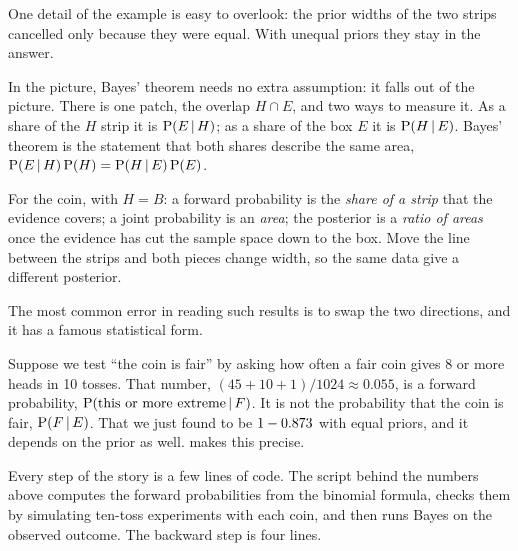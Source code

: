One detail of the example is easy to overlook: the prior widths of the two
strips cancelled only because they were equal. With unequal priors they stay
in the answer.

\begin{takeaway}
In the picture, Bayes' theorem needs no extra assumption: it falls out of
the picture. There is one patch, the overlap $H\cap E$, and two ways to
measure it. As a share of the $H$ strip it is $\operatorname{P}(E\,\vert\, H)$; as a share
of the box $E$ it is $\operatorname{P}(H\,\vert\, E)$. Bayes' theorem is the
statement that both shares describe the same area,
$\operatorname{P}(E\,\vert\, H)\operatorname{P}(H)=\operatorname{P}(H\,\vert\, E)\operatorname{P}(E)$.

For the coin, with $H=B$: a forward probability is the \emph{share of a strip}
that the evidence covers; a joint probability is an \emph{area}; the posterior
is a \emph{ratio of areas} once the evidence has cut the sample space down to
the box. Move the line between the strips and both pieces change width, so the
same data give a different posterior.

\smallskip{}
\end{takeaway}

The most common error in reading such results is to swap the two directions,
and it has a famous statistical form.

\begin{pitfall}
Suppose we test ``the coin is fair'' by asking how often a fair coin gives 8
or more heads in 10 tosses. That number, $(45+10+1)/1024\approx0.055$, is a
forward probability, $\operatorname{P}(\text{this or more extreme}\,\vert\, F)$. It is not
the probability that the coin is fair, $\operatorname{P}(F\,\vert\, E)$. That we just found
to be $1-0.873$ with equal priors, and it depends on the prior as
well.  makes this precise.

\smallskip{}
\end{pitfall}

Every step of the story is a few lines of code. The script behind the numbers
above computes the forward probabilities from the binomial formula, checks
them by simulating \CoinNexp{} ten-toss experiments with each coin, and then
runs Bayes on the observed outcome. The backward step is four lines.


